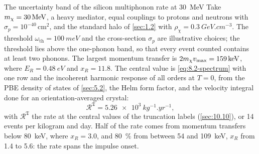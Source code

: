 \begin{workedexample}{The uncertainty band of the silicon multiphonon rate at \SI{30}{MeV}}\label{we:11-band30}
Take $m_{\chi} = \SI{30}{MeV}$, a heavy mediator, equal couplings to protons and neutrons with $\sigma_p = 10^{-40}\,\mathrm{cm^2}$, and the standard halo of \cref{sec:1.2} with $\rho_\chi = \SI{0.3}{GeV.cm^{-3}}$. The threshold $\omega_{\mathrm{th}} = \SI{100}{meV}$ and the cross-section $\sigma_p$ are illustrative choices; the threshold lies above the one-phonon band, so that every event counted contains at least two phonons. The largest momentum transfer is $2m_{\chi} v_{\mathrm{max}} = \SI{159}{keV}$, where $E_R = \SI{0.48}{eV}$ and $x_R = 11.8$. The central value is \cref{eq:8.2-spectrum} with one row and the incoherent harmonic response of all orders at $T = 0$, from the PBE density of states of \cref{sec:5.2}, the Helm form factor, and the velocity integral done for an orientation-averaged crystal:
\begin{equation*}
  \mathcal{R}^{\mathfrak{T}} = \SI{5.26e3}{kg^{-1}.yr^{-1}} ,
\end{equation*}
with $\mathcal{R}^{\mathfrak{T}}$ the rate at the central values of the truncation labels (\cref{sec:10.10}), or 14 events per kilogram and day. Half of the rate comes from momentum transfers below \SI{80}{keV}, where $x_R = 3.0$, and \SI{80}{\percent} from between 54 and \SI{109}{keV}, $x_R$ from 1.4 to 5.6: the rate spans the impulse onset.


\end{workedexample}

